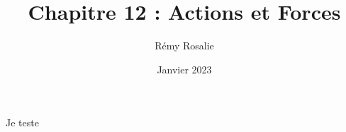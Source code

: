 \documentclass{beamer}
\title{Chapitre 12 : Actions et Forces}
\author{Rémy Rosalie}
\date{Janvier 2023}
\begin{document}
\begin{frame}
    Je teste
\end{frame}
\end{document}
